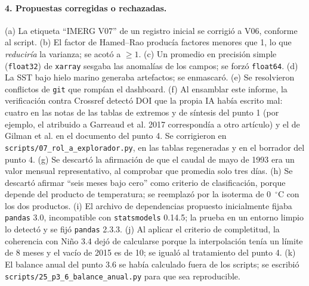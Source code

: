 \documentclass[11pt,a4paper]{article}
\newcommand{\archivo}[1]{\nolinkurl{#1}}
\begin{document}
\paragraph{4. Propuestas corregidas o rechazadas.} (a) La etiqueta ``IMERG V07'' de un registro inicial se corrigió a V06, conforme al script. (b) El factor de Hamed--Rao producía factores menores que 1, lo que \emph{reduciría} la varianza; se acotó a $\geq1$. (c) Un promedio en precisión simple (\texttt{float32}) de \texttt{xarray} sesgaba las anomalías de los campos; se forzó \texttt{float64}. (d) La SST bajo hielo marino generaba artefactos; se enmascaró. (e) Se resolvieron conflictos de \texttt{git} que rompían el dashboard. (f) Al ensamblar este informe, la verificación contra Crossref detectó DOI que la propia IA había escrito mal: cuatro en las notas de las tablas de extremos y de síntesis del punto 1 (por ejemplo, el atribuido a Garreaud et al. 2017 correspondía a otro artículo) y el de Gilman et al. en el documento del punto 4. Se corrigieron en \archivo{scripts/07_rol_a_explorador.py}, en las tablas regeneradas y en el borrador del punto 4. (g) Se descartó la afirmación de que el caudal de mayo de 1993 era un valor mensual representativo, al comprobar que promedia solo tres días. (h) Se descartó afirmar ``seis meses bajo cero'' como criterio de clasificación, porque depende del producto de temperatura; se reemplazó por la isoterma de 0~$^\circ$C con los dos productos. (i) El archivo de dependencias propuesto inicialmente fijaba \texttt{pandas} 3.0, incompatible con \texttt{statsmodels} 0.14.5; la prueba en un entorno limpio lo detectó y se fijó \texttt{pandas} 2.3.3. (j) Al aplicar el criterio de completitud, la coherencia con Niño 3.4 dejó de calcularse porque la interpolación tenía un límite de 8 meses y el vacío de 2015 es de 10; se igualó al tratamiento del punto 4. (k) El balance anual del punto 3.6 se había calculado fuera de los scripts; se escribió \archivo{scripts/25_p3_6_balance_anual.py} para que sea reproducible.
\end{document}
